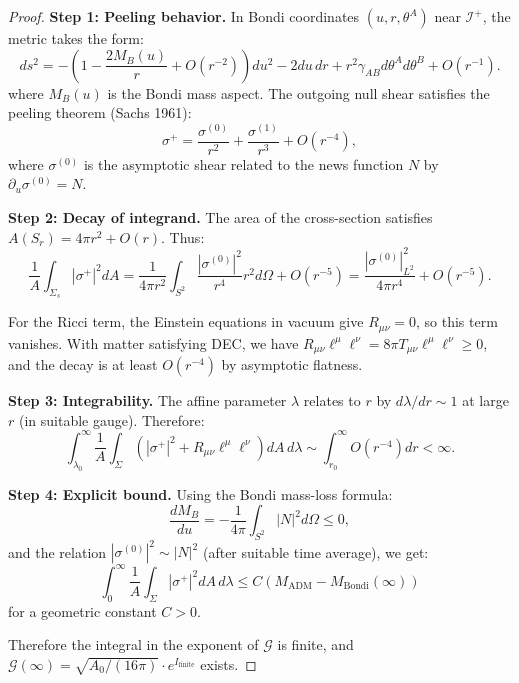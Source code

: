 \begin{proof}
\textbf{Step 1: Peeling behavior.}
In Bondi coordinates $(u, r, \theta^A)$ near $\mathscr{I}^+$, the metric takes the form:
\begin{equation}
    ds^2 = -\left(1 - \frac{2M_B(u)}{r} + O(r^{-2})\right) du^2 - 2 du\, dr + r^2 \gamma_{AB} d\theta^A d\theta^B + O(r^{-1}).
\end{equation}
where $M_B(u)$ is the Bondi mass aspect. The outgoing null shear satisfies the peeling theorem (Sachs 1961):
\begin{equation}
    \sigma^+ = \frac{\sigma^{(0)}}{r^2} + \frac{\sigma^{(1)}}{r^3} + O(r^{-4}),
\end{equation}
where $\sigma^{(0)}$ is the asymptotic shear related to the news function $N$ by $\partial_u \sigma^{(0)} = N$.

\textbf{Step 2: Decay of integrand.}
The area of the cross-section satisfies $A(S_r) = 4\pi r^2 + O(r)$. Thus:
\begin{equation}
    \frac{1}{A}\int_{\Sigma_s} |\sigma^+|^2 dA = \frac{1}{4\pi r^2} \int_{S^2} \frac{|\sigma^{(0)}|^2}{r^4} r^2 d\Omega + O(r^{-5}) = \frac{|\sigma^{(0)}|^2_{L^2}}{4\pi r^4} + O(r^{-5}).
\end{equation}

For the Ricci term, the Einstein equations in vacuum give $R_{\mu\nu} = 0$, so this term vanishes. With matter satisfying DEC, we have $R_{\mu\nu}\ell^\mu\ell^\nu = 8\pi T_{\mu\nu}\ell^\mu\ell^\nu \geq 0$, and the decay is at least $O(r^{-4})$ by asymptotic flatness.

\textbf{Step 3: Integrability.}
The affine parameter $\lambda$ relates to $r$ by $d\lambda/dr \sim 1$ at large $r$ (in suitable gauge). Therefore:
\begin{equation}
    \int_{\lambda_0}^\infty \frac{1}{A}\int_\Sigma(|\sigma^+|^2 + R_{\mu\nu}\ell^\mu\ell^\nu) dA\, d\lambda \sim \int_{r_0}^\infty O(r^{-4}) dr < \infty.
\end{equation}

\textbf{Step 4: Explicit bound.}
Using the Bondi mass-loss formula:
\begin{equation}
    \frac{dM_B}{du} = -\frac{1}{4\pi}\int_{S^2} |N|^2 d\Omega \leq 0,
\end{equation}
and the relation $|\sigma^{(0)}|^2 \sim |N|^2$ (after suitable time average), we get:
\begin{equation}
    \int_0^\infty \frac{1}{A}\int_\Sigma |\sigma^+|^2 dA\, d\lambda \leq C(M_{\mathrm{ADM}} - M_{\mathrm{Bondi}}(\infty))
\end{equation}
for a geometric constant $C > 0$.

Therefore the integral in the exponent of $\mathcal{G}$ is finite, and $\mathcal{G}(\infty) = \sqrt{A_0/(16\pi)} \cdot e^{I_{\text{finite}}}$ exists.
\end{proof}

